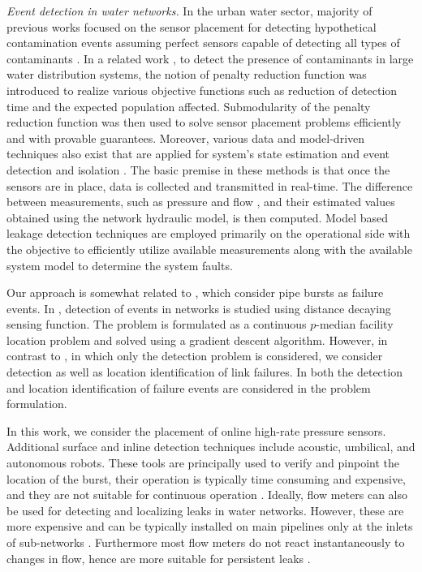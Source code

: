 \documentclass[twocolumn]{autart}
\begin{document}
\textit{Event detection in water networks.}
In the urban water sector, majority of previous works focused on the sensor placement for detecting hypothetical contamination events assuming perfect sensors capable of detecting all types of contaminants \cite{berry,5350461}. In a related work \cite{Krause08efficientsensor}, to detect the presence of contaminants in large water distribution systems, the notion of penalty reduction function was introduced to realize various objective functions such as reduction of detection time and the expected population affected. Submodularity of the penalty reduction function was then used to solve sensor placement problems efficiently and with provable guarantees. Moreover, various data and model-driven techniques also exist that are applied for system's state estimation and event detection and isolation \cite{eliades2014contamination,rosich2012fault}. The basic premise in these methods is that once the sensors are in place, data is collected and transmitted in real-time. The difference between measurements, such as pressure \cite{perez2014leak} and flow \cite{ragot2006fault}, and their estimated values obtained using the network hydraulic model, is then computed. Model based leakage detection techniques are employed primarily on the operational side with the objective to efficiently utilize available measurements along with the available system model to determine the system faults. \vspace{-0.35cm}

Our approach is somewhat related to \cite{fd:deshpande,fdi:sarrate}, which consider pipe bursts as failure events. In \cite{fd:deshpande}, detection of events in networks is studied using distance decaying sensing function. The problem is formulated as a continuous $p$-median facility location problem and solved using a gradient descent algorithm. However, in contrast to \cite{fd:deshpande}, in which only the detection problem is considered, we consider detection as well as location identification of link failures.  In \cite{fdi:sarrate} both the detection and location identification of failure events are considered in the problem formulation. \vspace{-0.35cm}

In this work, we consider the placement of online high-rate pressure sensors. Additional surface and inline detection techniques include acoustic, umbilical, and autonomous robots. These tools are principally used to verify and pinpoint the location of the burst, their operation is typically time consuming and expensive, and they are not suitable for continuous operation \cite{6901220}. Ideally, flow meters can also be used for detecting and localizing leaks in water networks. However, these are more expensive and can be typically installed on main pipelines only at the inlets of sub-networks \cite{Narayanan:2014:OMF:2602339.2602346}. Furthermore most flow meters do not react instantaneously to changes in flow, hence are more suitable for persistent leaks \cite{doi:10.1080/15730621003610878}.
\end{document}
